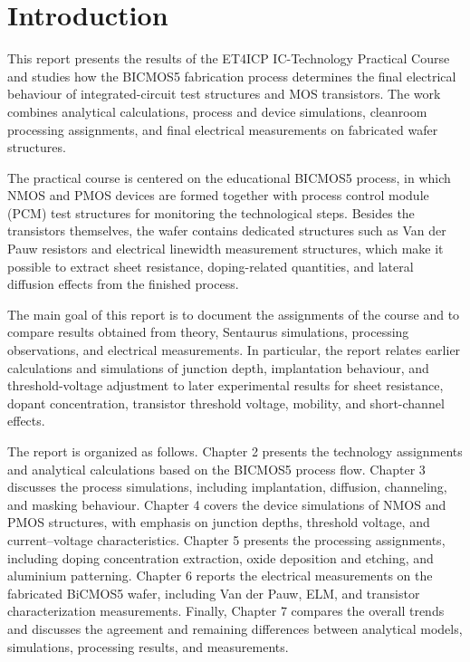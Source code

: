 \section{Introduction}

This report presents the results of the ET4ICP IC-Technology Practical Course and studies how the BICMOS5 fabrication process determines the final electrical behaviour of integrated-circuit test structures and MOS transistors. The work combines analytical calculations, process and device simulations, cleanroom processing assignments, and final electrical measurements on fabricated wafer structures.

The practical course is centered on the educational BICMOS5 process, in which NMOS and PMOS devices are formed together with process control module (PCM) test structures for monitoring the technological steps. Besides the transistors themselves, the wafer contains dedicated structures such as Van der Pauw resistors and electrical linewidth measurement structures, which make it possible to extract sheet resistance, doping-related quantities, and lateral diffusion effects from the finished process.

The main goal of this report is to document the assignments of the course and to compare results obtained from theory, Sentaurus simulations, processing observations, and electrical measurements. In particular, the report relates earlier calculations and simulations of junction depth, implantation behaviour, and threshold-voltage adjustment to later experimental results for sheet resistance, dopant concentration, transistor threshold voltage, mobility, and short-channel effects.

The report is organized as follows. Chapter 2 presents the technology assignments and analytical calculations based on the BICMOS5 process flow. Chapter 3 discusses the process simulations, including implantation, diffusion, channeling, and masking behaviour. Chapter 4 covers the device simulations of NMOS and PMOS structures, with emphasis on junction depths, threshold voltage, and current--voltage characteristics. Chapter 5 presents the processing assignments, including doping concentration extraction, oxide deposition and etching, and aluminium patterning. Chapter 6 reports the electrical measurements on the fabricated BiCMOS5 wafer, including Van der Pauw, ELM, and transistor characterization measurements. Finally, Chapter 7 compares the overall trends and discusses the agreement and remaining differences between analytical models, simulations, processing results, and measurements.